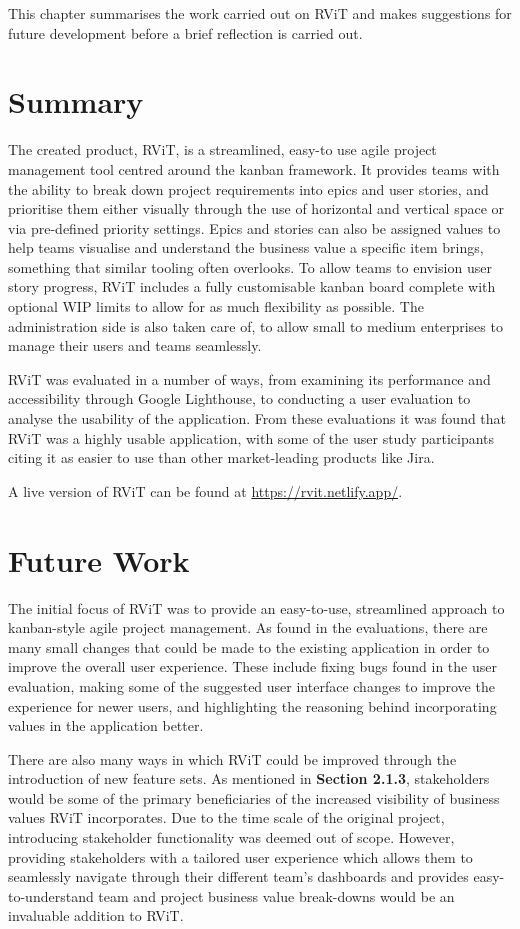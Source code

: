 \documentclass[l4proj.tex]{subfiles}
\begin{document}
  

This chapter summarises the work carried out on RViT and makes suggestions for future development before a brief reflection is carried out. 

\section{Summary}
The created product, RViT, is a streamlined, easy-to use agile project management tool centred around the kanban framework. It provides teams with the ability to break down project requirements into epics and user stories, and prioritise them either visually through the use of horizontal and vertical space or via pre-defined priority settings. Epics and stories can also be assigned values to help teams visualise and understand the business value a specific item brings, something that similar tooling often overlooks. To allow teams to envision user story progress, RViT includes a fully customisable kanban board complete with optional WIP limits to allow for as much flexibility as possible. The administration side is also taken care of, to allow small to medium enterprises to manage their users and teams seamlessly.

RViT was evaluated in a number of ways, from examining its performance and accessibility through Google Lighthouse, to conducting a user evaluation to analyse the usability of the application. From these evaluations it was found that RViT was a highly usable application, with some of the user study participants citing it as easier to use than other market-leading products like Jira. 

A live version of RViT can be found at \url{https://rvit.netlify.app/}.

\section{Future Work}
The initial focus of RViT was to provide an easy-to-use, streamlined approach to kanban-style agile project management. As found in the evaluations, there are many small changes that could be made to the existing application in order to improve the overall user experience. These include fixing bugs found in the user evaluation, making some of the suggested user interface changes to improve the experience for newer users, and highlighting the reasoning behind incorporating values in the application better. 

There are also many ways in which RViT could be improved through the introduction of new feature sets. As mentioned in \textbf{Section 2.1.3}, stakeholders would be some of the primary beneficiaries of the increased visibility of business values RViT incorporates. Due to the time scale of the original project, introducing stakeholder functionality was deemed out of scope. However, providing stakeholders with a tailored user experience which allows them to seamlessly navigate through their different team's dashboards and provides easy-to-understand team and project business value break-downs would be an invaluable addition to RViT.
\end{document}
